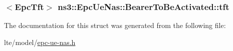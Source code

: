 \subsubsection[{\texorpdfstring{tft}{tft}}]{$<${\bf Epc\+Tft}$>$ ns3\+::\+Epc\+Ue\+Nas\+::\+Bearer\+To\+Be\+Activated\+::tft}\hypertarget{structns3_1_1EpcUeNas_1_1BearerToBeActivated_a29bd7669f5a3036c798596ab44bf9c81}{}\label{structns3_1_1EpcUeNas_1_1BearerToBeActivated_a29bd7669f5a3036c798596ab44bf9c81}


The documentation for this struct was generated from the following file\+:\begin{DoxyCompactItemize}
\item 
lte/model/\hyperlink{epc-ue-nas_8h}{epc-\/ue-\/nas.\+h}\end{DoxyCompactItemize}
